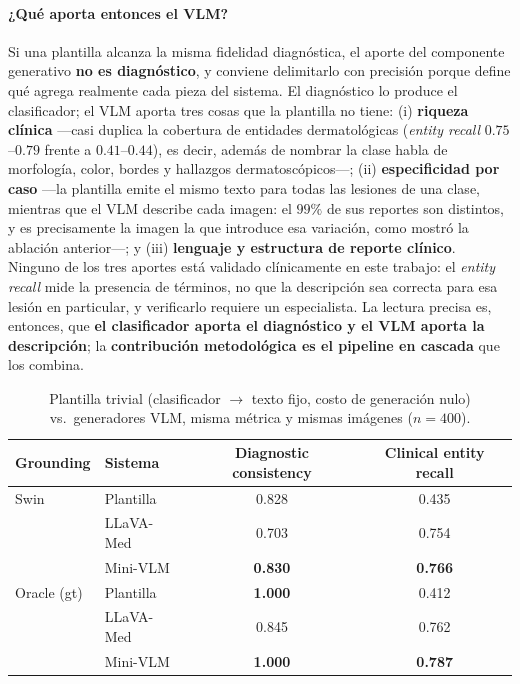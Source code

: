 \documentclass[11pt, a4paper]{article}
\begin{document}
\paragraph{¿Qué aporta entonces el VLM?} Si una plantilla alcanza la misma fidelidad diagnóstica, el aporte
del componente generativo \textbf{no es diagnóstico}, y conviene delimitarlo con precisión porque define qué
agrega realmente cada pieza del sistema. El diagnóstico lo produce el clasificador; el VLM aporta tres cosas
que la plantilla no tiene: (i) \textbf{riqueza clínica} —casi duplica la cobertura de entidades
dermatológicas (\emph{entity recall} $0.75$--$0.79$ frente a $0.41$--$0.44$), es decir, además de nombrar la
clase habla de morfología, color, bordes y hallazgos dermatoscópicos—; (ii) \textbf{especificidad por
caso} —la plantilla emite el mismo texto para todas las lesiones de una clase, mientras que el VLM describe
cada imagen: el $99\%$ de sus reportes son distintos, y es precisamente la imagen la que introduce esa
variación, como mostró la ablación anterior—; y (iii) \textbf{lenguaje y estructura de reporte clínico}.
Ninguno de los tres aportes está validado clínicamente en este trabajo: el \emph{entity recall} mide la
presencia de términos, no que la descripción sea correcta para esa lesión en particular, y verificarlo
requiere un especialista. La lectura precisa es, entonces, que \textbf{el clasificador aporta el
diagnóstico y el VLM aporta la descripción}; la \textbf{contribución metodológica es el pipeline en cascada}
que los combina.

\begin{table}[H]
  \centering
  \caption{Plantilla trivial (clasificador $\to$ texto fijo, costo de generación nulo) vs.\ generadores VLM,
  misma métrica y mismas imágenes ($n=400$).}
  \label{tab:plantilla}
  \small
  \begin{tabular}{llcc}
    \toprule
    \textbf{Grounding} & \textbf{Sistema} & \textbf{Diagnostic consistency} & \textbf{Clinical entity recall} \\
    \midrule
    Swin        & Plantilla   & 0.828 & 0.435 \\
                & LLaVA-Med   & 0.703 & 0.754 \\
                & Mini-VLM    & \textbf{0.830} & \textbf{0.766} \\
    \midrule
    Oracle (gt) & Plantilla   & \textbf{1.000} & 0.412 \\
                & LLaVA-Med   & 0.845 & 0.762 \\
                & Mini-VLM    & \textbf{1.000} & \textbf{0.787} \\
    \bottomrule
  \end{tabular}
\end{table}
\end{document}
